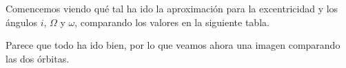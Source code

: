 Comencemos viendo qué tal ha ido la aproximación para la excentricidad y los ángulos $i$, $\Omega$ y $\omega$, comparando los valores en la siguiente tabla.
\begin{table}[H]
\centering
{}
\end{table}

Parece que todo ha ido bien, por lo que veamos ahora una imagen comparando las dos órbitas.


